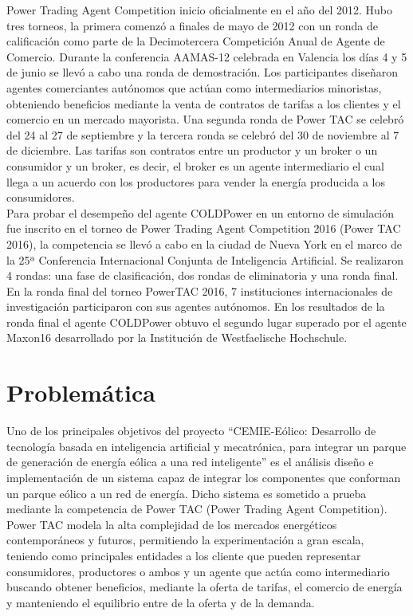 Power Trading Agent Competition inicio oficialmente en el año del 2012. Hubo tres torneos, la primera comenzó a finales de mayo de 2012 con un ronda de calificación  como parte de la  Decimotercera Competición Anual de Agente de Comercio. Durante la conferencia AAMAS-12 celebrada en Valencia los días 4 y 5 de junio se llevó a cabo una ronda de demostración. Los participantes diseñaron agentes comerciantes autónomos que actúan como intermediarios minoristas, obteniendo beneficios mediante la venta de contratos de tarifas a los clientes y el comercio en un mercado mayorista. Una segunda ronda de Power TAC se celebró del 24 al 27 de septiembre y la tercera ronda se celebró del 30 de noviembre al 7 de diciembre.
Las tarifas son contratos entre un productor y un broker o un consumidor y un broker, es decir, el broker es un agente intermediario el cual llega a un acuerdo con los productores para vender la energía producida a los consumidores.\\

Para probar el desempeño del agente COLDPower en un entorno de simulación fue inscrito en el torneo de Power Trading Agent Competition 2016 (Power TAC 2016), la competencia se llevó a cabo en la ciudad de Nueva York en el marco de la 25ª Conferencia Internacional Conjunta de Inteligencia Artificial. Se realizaron 4 rondas: una fase de clasificación, dos rondas de eliminatoria y una ronda final. En la ronda final del torneo PowerTAC 2016, 7 instituciones internacionales de investigación participaron con sus agentes autónomos. En los resultados de la ronda final el agente COLDPower obtuvo el segundo lugar superado por el agente Maxon16 desarrollado por la Institución de Westfaelische Hochschule.

\section{Problemática}
Uno de los principales objetivos del proyecto “CEMIE-Eólico: Desarrollo de tecnología basada en inteligencia artificial y mecatrónica, para integrar un parque de generación de energía eólica a una red inteligente” es el análisis diseño e implementación de un sistema capaz de integrar los componentes que conforman un parque eólico a un red de energía. Dicho sistema es sometido a prueba mediante la competencia de Power TAC (Power Trading Agent Competition).
\\

Power TAC modela la alta complejidad de los mercados energéticos contemporáneos y futuros, permitiendo la experimentación a gran escala, teniendo como principales entidades a los cliente que pueden representar consumidores,  productores o ambos y un agente que actúa como intermediario buscando obtener beneficios, mediante la oferta de tarifas, el comercio de energía y manteniendo el equilibrio entre de la oferta y de la demanda.
\\
 
